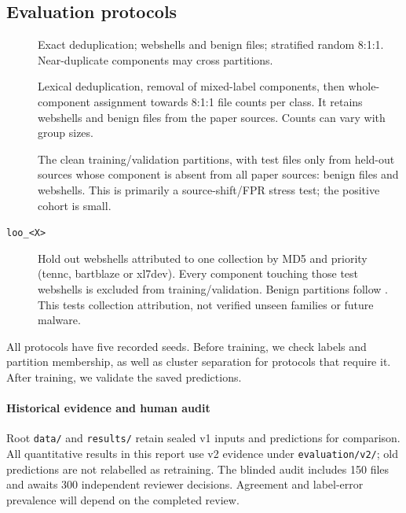 \subsection{Evaluation protocols}
\begin{description}
\item[\pr] Exact deduplication;  webshells and
 benign files; stratified random 8:1:1. Near-duplicate components may cross partitions.
\item[\cg] Lexical deduplication, removal of mixed-label components, then whole-component assignment towards
8:1:1 file counts per class. It retains  webshells and
 benign files from the paper sources. Counts can vary with group sizes.
\item[\xs] The clean training/validation partitions, with test files only from held-out sources whose component
is absent from all paper sources:  benign files and
 webshells. This is primarily a source-shift/FPR stress test; the positive cohort is small.
\item[\texttt{loo\_<X>}] Hold out webshells attributed to one collection by MD5 and priority (tennc, bartblaze or xl7dev).
Every component touching those test webshells is excluded from training/validation. Benign partitions follow
\cg. This tests collection attribution, not verified unseen families or future malware.
\end{description}
All protocols have five recorded seeds. Before training, we check labels and partition membership, as well
as cluster separation for protocols that require it. After training, we validate the saved predictions.

\paragraph{Historical evidence and human audit}
Root \texttt{data/} and \texttt{results/} retain sealed v1 inputs and predictions for comparison. All quantitative
results in this report use v2 evidence under \texttt{evaluation/v2/}; old predictions are not relabelled as retraining.
The blinded audit includes 150 files and awaits 300 independent reviewer decisions. Agreement and
label-error prevalence will depend on the completed review.
